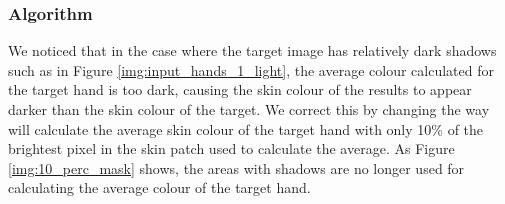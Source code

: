 \subsubsection*{Algorithm}
We noticed that in the case where the target image has relatively dark shadows such as in Figure \ref{img:input_hands_1_light}, the average colour calculated for the target hand is too dark, causing the skin colour of the results to appear darker than the skin colour of the target. We correct this by changing the way will calculate the average skin colour of the target hand with only 10\% of the brightest pixel in the skin patch used to calculate the average. As Figure \ref{img:10_perc_mask} shows, the areas with shadows are no longer used for calculating the average colour of the target hand.




% 


